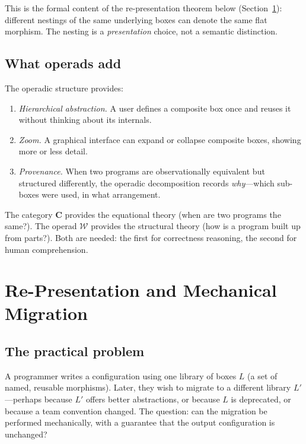 \documentclass[11pt]{article}
\newcommand{\cat}[1]{\mathbf{#1}}
\begin{document}
    This is the formal content of the re-presentation theorem below
    (Section~\ref{sec:repr}): different nestings of the same underlying boxes can denote
    the same flat morphism. The nesting is a \emph{presentation} choice, not a semantic
    distinction.

    \subsection{What operads add}

    The operadic structure provides:
    \begin{enumerate}
        \item \emph{Hierarchical abstraction.} A user defines a composite box once and
        reuses it without thinking about its internals.
        \item \emph{Zoom.} A graphical interface can expand or collapse composite boxes,
        showing more or less detail.
        \item \emph{Provenance.} When two programs are observationally equivalent but
        structured differently, the operadic decomposition records \emph{why}---which
        sub-boxes were used, in what arrangement.
    \end{enumerate}

    The category $\cat{C}$ provides the equational theory (when are two programs the
    same?). The operad $\mathcal{W}$ provides the structural theory (how is a program
    built up from parts?). Both are needed: the first for correctness reasoning, the
    second for human comprehension.

    \section{Re-Presentation and Mechanical Migration}
    \label{sec:repr}

    \subsection{The practical problem}

    A programmer writes a configuration using one library of boxes $L$ (a set of named,
    reusable morphisms). Later, they wish to migrate to a different library $L'$---perhaps
    because $L'$ offers better abstractions, or because $L$ is deprecated, or because a
    team convention changed. The question: can the migration be performed mechanically,
    with a guarantee that the output configuration is unchanged?
\end{document}
